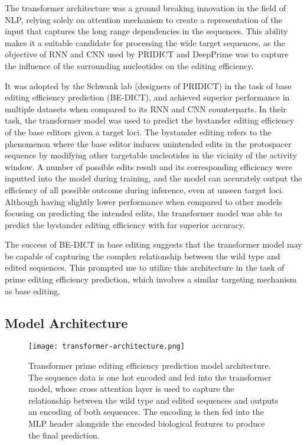 The transformer architecture was a ground breaking innovation in the field of NLP, relying solely on attention mechanism to create a representation of the input that captures the long range dependencies in the sequences\cite{vaswaniAttentionAllYou2017}. This ability makes it a suitable candidate for processing the wide target sequences, as the objective of RNN and CNN used by PRIDICT and DeepPrime was to capture the influence of the surrounding nucleotides on the editing efficiency.

It was adopted by the Schwank lab (designers of PRIDICT) in the task of base editing efficiency prediction (BE-DICT), and achieved superior performance in multiple datasets when compared to its RNN and CNN counterparts\cite{marquartPredictingBaseEditing2021}. In their task, the transformer model was used to predict the bystander editing efficiency of the base editors given a target loci. The bystander editing refers to the phenomenon where the base editor induces unintended edits in the protospacer sequence by modifying other targetable nucleotides in the vicinity of the activity window. A number of possible edits result and its corresponding efficiency were inputted into the model during training, and the model can accurately output the efficiency of all possible outcome during inference, even at unseen target loci. Although having slightly lower performance when compared to other models focusing on predicting the intended edits, the transformer model was able to predict the bystander editing efficiency with far superior accuracy.

The success of BE-DICT in base editing suggests that the transformer model may be capable of capturing the complex relationship between the wild type and edited sequences. This prompted me to utilize this architecture in the task of prime editing efficiency prediction, which involves a similar targeting mechanism as base editing.

\subsection{Model Architecture}

\begin{figure}
    \centering
    \texttt{[image: transformer-architecture.png]}
    \caption[Transformer Model Architecture]{Transformer prime editing efficiency prediction model architecture. The sequence data is one hot encoded and fed into the transformer model, whose cross attention layer is used to capture the relationship between the wild type and edited sequences and outputs an encoding of both sequences. The encoding is then fed into the MLP header alongside the encoded biological features to produce the final prediction.}
    \label{fig:transformer-model}
\end{figure}

